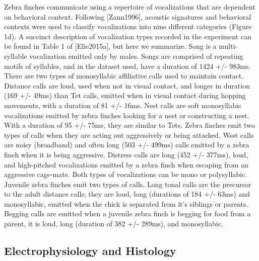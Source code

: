 Zebra finches communicate using a repertoire of vocalizations that are dependent on behavioral context. Following [Zann1996], acoustic signatures and behavioral contexts were used to classify vocalizations into nine different categories (Figure 1d). A succinct description of vocalization types recorded in the experiment can be found in Table 1 of [Elie2015a], but here we summarize.
Song is a multi-syllable vocalization emitted only by males. Songs are comprised of repeating motifs of syllables, and in the dataset used, have a duration of 1424 +/- 983ms. There are two types of monosyllabic affiliative calls used to maintain contact. Distance calls are loud, used when not in visual contact, and longer in duration (169 +/- 49ms) than Tet calls, emitted when in visual contact during hopping movements, with a duration of 81 +/- 16ms. Nest calls are soft monosyllabic vocalizations emitted by zebra finches looking for a nest or constructing a nest. With a duration of 95 +/- 75ms, they are similar to Tets.
Zebra finches emit two types of calls when they are acting out aggressively or being attacked. Wsst calls are noisy (broadband) and often long (503 +/- 499ms) calls emitted by a zebra finch when it is being aggressive. Distress calls are long (452 +/- 377ms), loud, and high-pitched vocalizations emitted by a zebra finch when escaping from an aggressive cage-mate. Both types of vocalizations can be mono or polysyllabic.
Juvenile zebra finches emit two types of calls. Long tonal calls are the precursor to the adult distance calls; they are loud, long (durations of 184 +/- 63ms) and monosyllabic, emitted when the chick is separated from it’s siblings or parents. Begging calls are emitted when a juvenile zebra finch is begging for food from a parent, it is loud, long (duration of 382 +/- 289ms), and monosyllabic.

\subsection{Electrophysiology and Histology}


